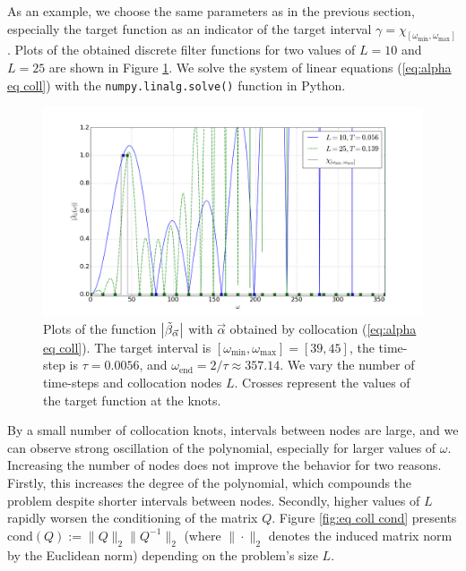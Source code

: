 \documentclass[a4paper,11pt,bibliography=totoc,listof=totoc,headinclude=true,cleardoublepage=empty,oneside]{scrbook}
\newcommand{\dffv}{\Tilde{\beta}_{\Vec{\alpha}}}
\newcommand{\e}{\mathrm{end}}
\renewcommand{\eqref}[1]{(\ref{#1})}
\begin{document}
As an example, we choose the same parameters as in the previous section, especially the target function as an indicator of the target interval $\gamma = \chi_{\left[\omega_{\min}, \omega_{\max}\right]}$. Plots of the obtained discrete filter functions for two values of $L = 10 $ and $L=25$ are shown in Figure \ref{fig:eq coll beta}. We solve the system of linear equations \eqref{eq:alpha eq coll} with the \texttt{numpy.linalg.solve()} function in Python.

\begin{figure}[h]
    \centering
    \includegraphics[width=1\linewidth]{latex//images//equi_coll/Figure_1.png}
    \caption{Plots of the function $\left|\dffv\right|$ with $\Vec{\alpha}$ obtained by collocation \eqref{eq:alpha eq coll}. The target interval is $\left[\omega_{\min}, \omega_{\max} \right] = [39, 45]$, the time-step is $\tau = 0.0056$, and $\omega_\e = 2/\tau \approx 357.14$. We vary the number of time-steps and collocation nodes $L$. Crosses represent the values of the target function at the knots.}
    \label{fig:eq coll beta}
\end{figure}
\newpage
By a small number of collocation knots, intervals between nodes are large, and we can observe strong oscillation of the polynomial, especially for larger values of $\omega$. Increasing the number of nodes does not improve the behavior for two reasons. Firstly, this increases the degree of the polynomial, which compounds the problem despite shorter intervals between nodes. Secondly, higher values of $L$ rapidly worsen the conditioning of the matrix $Q$. Figure \ref{fig:eq coll cond} presents $\mathrm{cond}(Q) := \|Q\|_2 \|Q^{-1}\|_2$ (where $\| \cdot \|_2$ denotes the induced matrix norm by the Euclidean norm) depending on the problem's size $L$.
\end{document}
